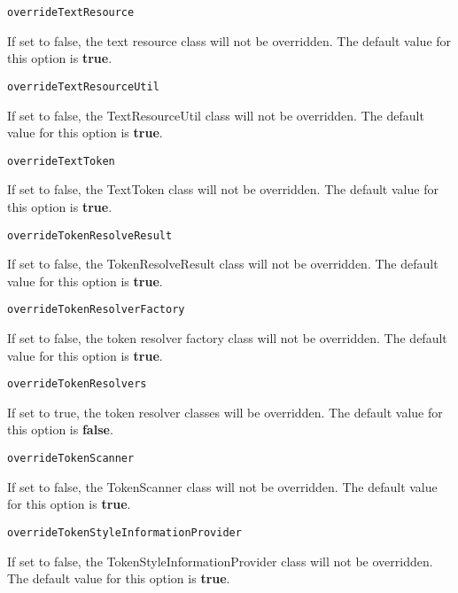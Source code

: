 \noindent\texttt{overrideTextResource}
\begin{myindentpar}{1cm}
If set to false, the text resource class will not be overridden. The default value for this option is \textbf{true}.
\end{myindentpar}

\noindent\texttt{overrideTextResourceUtil}
\begin{myindentpar}{1cm}
If set to false, the TextResourceUtil class will not be overridden. The default value for this option is \textbf{true}.
\end{myindentpar}

\noindent\texttt{overrideTextToken}
\begin{myindentpar}{1cm}
If set to false, the TextToken class will not be overridden. The default value for this option is \textbf{true}.
\end{myindentpar}

\noindent\texttt{overrideTokenResolveResult}
\begin{myindentpar}{1cm}
If set to false, the TokenResolveResult class will not be overridden. The default value for this option is \textbf{true}.
\end{myindentpar}

\noindent\texttt{overrideTokenResolverFactory}
\begin{myindentpar}{1cm}
If set to false, the token resolver factory class will not be overridden. The default value for this option is \textbf{true}.
\end{myindentpar}

\noindent\texttt{overrideTokenResolvers}
\begin{myindentpar}{1cm}
If set to true, the token resolver classes will be overridden. The default value for this option is \textbf{false}.
\end{myindentpar}

\noindent\texttt{overrideTokenScanner}
\begin{myindentpar}{1cm}
If set to false, the TokenScanner class will not be overridden. The default value for this option is \textbf{true}.
\end{myindentpar}

\noindent\texttt{overrideTokenStyleInformationProvider}
\begin{myindentpar}{1cm}
If set to false, the TokenStyleInformationProvider class will not be overridden. The default value for this option is \textbf{true}.
\end{myindentpar}

